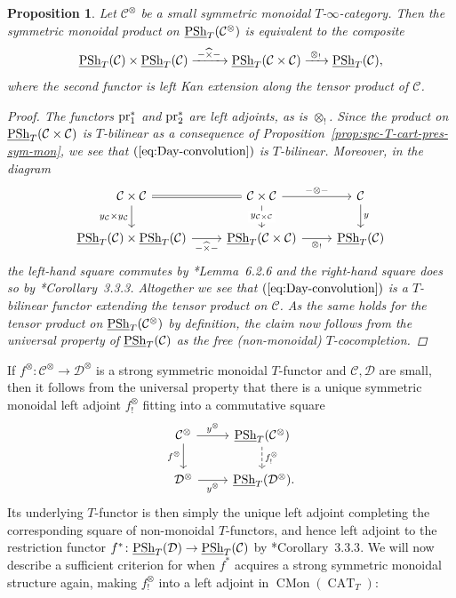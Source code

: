 \documentclass[reqno]{memo-l}
\theoremstyle{mythm}
\newtheorem{prop}[thm]{Proposition}
\theoremstyle{definition}
\numberwithin{equation}{section}
\newcommand{\Cc}{{\mathcal{C}}}
\newcommand{\Dd}{{\mathcal{D}}}
\newcommand{\exttimes}{\mathbin{\widehat{\smash{\times}}}}
\DeclareMathOperator{\CAT}{CAT}
\DeclareMathOperator{\PSh}{PSh}
\DeclareMathOperator{\CMon}{CMon}
\newcommand{\pr}{\textup{pr}}
\newcommand{\ulhelper}[2]{\underline{\setbox0=\hbox{$#1#2$}\dp0=0.4pt \box0\relax}}
\newcommand{\ul}[1]{{\mathpalette\ulhelper{#1}}\hbox{\rule[-2pt]{0pt}{0pt}}}
\begin{document}
\begin{prop}\label{prop:Day-convolution}
    Let $\Cc^\otimes$ be a small symmetric monoidal $T$-$\infty$-category. Then the symmetric monoidal product on $\ul\PSh_T(\Cc^\otimes)$ is equivalent to the composite
    \begin{equation}\label{eq:Day-convolution}
        \ul\PSh_T(\Cc)\times\ul\PSh_T(\Cc)\xrightarrow{\;{-}\exttimes{-}\;}\ul\PSh_T(\Cc\times\Cc)\xrightarrow{\;\otimes_!\;}\ul\PSh_T(\Cc),
    \end{equation}
    where the second functor is left Kan extension along the tensor product of $\Cc$.
    \begin{proof}
        The functors $\pr_1^*$ and $\pr_2^*$ are left adjoints, as is $\otimes_!$. Since the product on $\ul\PSh_T(\Cc\times\Cc)$ is $T$-bilinear as a consequence of Proposition~\ref{prop:spc-T-cart-pres-sym-mon}, we see that $(\ref{eq:Day-convolution})$ is $T$-bilinear. Moreover, in the diagram
        \[
            \begin{tikzcd}
                \Cc\times\Cc\arrow[d,"y_\Cc\times y_\Cc"']\arrow[r,equals] & \Cc\times\Cc\arrow[r,"{-}\otimes{-}"]\arrow[d,"y_{\Cc\times\Cc}"{description}]&\Cc\arrow[d,"y"]\\
                \ul\PSh_T(\Cc)\times\ul\PSh_T(\Cc)\arrow[r,"{-}\exttimes{-}"'] & \ul\PSh_T(\Cc\times\Cc)\arrow[r,"\otimes_!"'] & \ul\PSh_T(\Cc)
            \end{tikzcd}
        \]
        the left-hand square commutes by \cite{martini2022cocartesianfibrationsstraighteninginternal}*{Lemma~6.2.6} and the right-hand square does so by \cite{martiniwolf2021limits}*{Corollary~3.3.3}. Altogether we see that $(\ref{eq:Day-convolution})$ is a $T$-bilinear functor extending the tensor product on $\Cc$. As the same holds for the tensor product on $\ul\PSh_T(\Cc^\otimes)$ by definition, the claim now follows from the universal property of $\ul\PSh_T(\Cc)$ as the free (non-monoidal) $T$-cocompletion.
    \end{proof}
\end{prop}

If $f^\otimes\colon\Cc^\otimes\to\Dd^\otimes$ is a strong symmetric monoidal $T$-functor and $\Cc,\Dd$ are small, then it follows from the universal property that there is a unique symmetric monoidal left adjoint $f_!^\otimes$ fitting into a commutative square
\[
    \begin{tikzcd}
        \Cc^\otimes\arrow[d,"f^\otimes"']\arrow[r,"y^\otimes"] & \ul\PSh_T(\Cc^\otimes)\arrow[d,dashed,"f^\otimes_!"]\\
        \Dd^\otimes\arrow[r,"y^\otimes"'] & \ul\PSh_T(\Dd^\otimes)\rlap.
    \end{tikzcd}
\]
Its underlying $T$-functor is then simply the unique left adjoint completing the corresponding square of non-monoidal $T$-functors, and hence left adjoint to the restriction functor $f^*\colon\ul\PSh_T(\Dd)\to\ul\PSh_T(\Cc)$ by \cite{martiniwolf2021limits}*{Corollary~3.3.3}. We will now describe a sufficient criterion for when $f^*$ acquires a strong symmetric monoidal structure again, making $f_!^\otimes$ into a left adjoint in $\CMon(\CAT_T)$:
\end{document}

